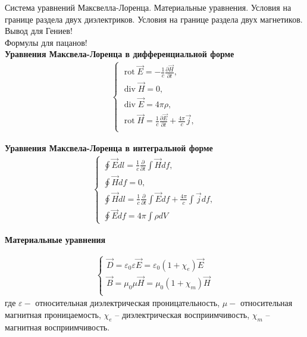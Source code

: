 \documentclass[__main__.tex]{subfiles}
\begin{document}
Система уравнений Максвелла-Лоренца. Материальные уравнения. Условия на границе раздела двух диэлектриков. Условия на границе раздела двух магнетиков.\\

Вывод для Гениев!\\
Формулы для пацанов!\\

\textbf{Уравнения Максвела-Лоренца в дифференциальной форме}
\begin{gather*}
    \begin{cases}
        \operatorname{rot} \vec{E} 
        =
        -\frac{1}{c}\frac{\partial \vec{H}}{\partial t},           \\
        \operatorname{div} \vec{H} 
        = 
        0,                                                                   \\
        \operatorname{div}\vec{E}
        =
        4\pi\rho,                                                            \\
        \operatorname{rot}\vec{H}=
        \frac{1}{c}\frac{\partial\vec{E}}{\partial t}+\frac{4\pi}{c}\vec{j}, \\
    \end{cases}
\end{gather*}

\textbf{Уравнения Максвела-Лоренца в интегральной форме}
\begin{gather*}
	\begin{cases}
		\oint \vec{E} dl = \frac{1}{c}\frac{\partial}{\partial t}\int \vec{H} df,\\
		\oint \vec{H} df = 0, \\
		\oint \vec{H} dl = \frac{1}{c}\frac{\partial}{\partial t}\int \vec{E} df + \frac{4\pi}{c}\int \vec{j} df,\\
		\oint \vec{E} df = 4\pi\int \rho dV
	\end{cases}
\end{gather*}

\textbf{Материальные уравнения}

\begin{gather*}
    \begin{cases}
        \vec{D}=\varepsilon_{0}\varepsilon\vec{E}=\varepsilon_{0}(1+\chi_{e})\vec{E} \\
        \vec{B}=\mu_{0}\mu\vec{H}=\mu_{0}(1+\chi _{m})\vec{H}                        \\
    \end{cases}
\end{gather*}
где $\varepsilon-$ относительная диэлектрическая проницательность, $\mu-$ относительная магнитная проницаемость, $\chi_{e}$ -- диэлектрическая восприимчивость, $\chi _{m}$ -- магнитная восприимчивость.
\end{document}
